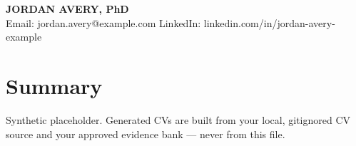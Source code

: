 \documentclass[11pt]{extarticle}
\begin{document}
\begin{center}
  {\LARGE \textbf{JORDAN AVERY, PhD}} \\
  \small
  Email: jordan.avery@example.com \quad
  LinkedIn: linkedin.com/in/jordan-avery-example
\end{center}

\section*{Summary}
Synthetic placeholder. Generated CVs are built from your local, gitignored CV
source and your approved evidence bank — never from this file.
\end{document}
